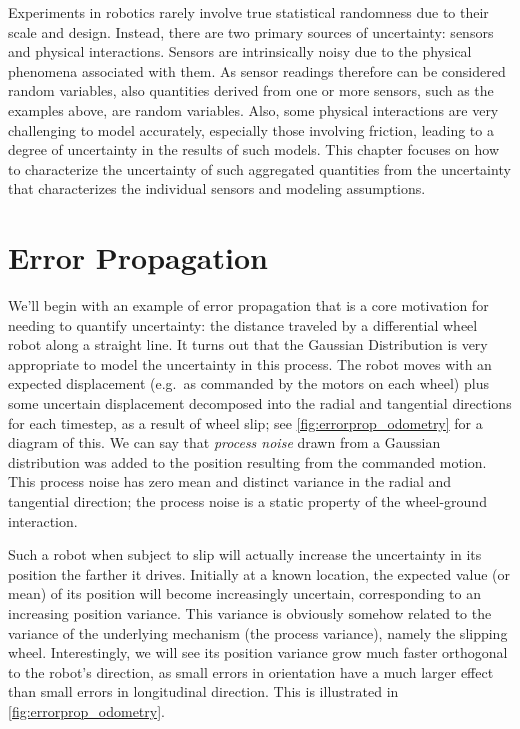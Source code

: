 Experiments in robotics rarely involve true statistical randomness due to their scale and design. Instead, there are two primary sources
of uncertainty: sensors and physical interactions. Sensors are intrinsically noisy due to the physical phenomena associated with them.
As sensor readings therefore can be considered random variables, also quantities derived from one or more sensors, such as the examples
above, are random variables. Also, some physical interactions are very challenging to model accurately, especially those involving
friction, leading to a degree of uncertainty in the results of such models. This chapter focuses on how to characterize the uncertainty
of such aggregated quantities from the uncertainty that characterizes the individual sensors and modeling assumptions.

\section{Error Propagation}\label{sec:errorprop}
We'll begin with an example of error propagation that is a core motivation for needing to quantify uncertainty: the distance traveled by a
differential wheel robot along a straight line. It turns out that the Gaussian Distribution is very appropriate to model the uncertainty in this process. The robot moves with an expected displacement (e.g.\ as commanded by the motors on each wheel) plus some uncertain displacement decomposed into the radial and tangential directions for each timestep, as a result of wheel slip; see \cref{fig:errorprop_odometry} for a diagram of this. We can say that \textsl{process noise} drawn from a Gaussian distribution was added to the position resulting from the commanded motion. This process noise has zero mean and distinct variance in the radial and tangential direction; the process noise is a static property of the wheel-ground interaction.

Such a robot when subject to slip will actually increase the uncertainty in its position the farther it drives. Initially at a known location, the expected value (or mean) of its position will become increasingly uncertain, corresponding to an increasing position variance. This variance is obviously somehow related to the variance of the underlying mechanism (the process variance), namely the slipping wheel. Interestingly, we will see its position variance grow much faster orthogonal to the robot's direction, as small errors in orientation have a much larger effect than small errors in longitudinal direction. This is illustrated in \cref{fig:errorprop_odometry}.

